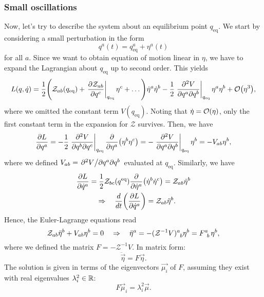 \documentclass{article}
\begin{document}
\subsubsection*{Small oscillations}
Now, let's try to describe the system about an equilibrium point $ q_{\text{eq}} $. We start by considering a small perturbation in the form
\begin{equation}
	q^{a}(t) = q^{a}_{\text{eq}} + \eta^{a}(t)
\end{equation}
for all $ a $. Since we want to obtain equation of motion linear in $ \eta $, we have to expand the Lagrangian about $ q_{\text{eq}} $ up to second order. This yields
\begin{equation}
	L(q,\dot{q}) = \frac{1}{2} \qty(\mathcal{Z}_{ab}(q_{\text{eq}}) + \eval{\pdv{\mathcal{Z}_{ab}}{q^{c}}}_{q_{\text{eq}}} \eta^{c} + \dots ) \dot{\eta}^{a} \dot{\eta}^{b} - \frac{1}{2} \eval{\pdv{V}{q^{a}}{q^{b}}}_{q_{\text{eq}}} \eta^{a} \eta^{b} + \order{\eta^{3}},
\end{equation}
where we omitted the constant term $ V(q_{\text{eq}}) $. Noting that $ \dot{\eta} = \order{\eta} $, only the first constant term in the expansion for $ \mathcal{Z} $ survives. Then, we have
\[
	\pdv{L}{q^{a}} = - \frac{1}{2}\eval{\pdv{V}{q^{b}}{q^{c}}}_{q_{\text{eq}}} \pdv{\eta^{a}}(\eta^{b} \eta^{c}) = - \eval{\pdv{V}{q^{a}}{q^{b}}}_{q_{\text{eq}}} \eta^{b} = - V_{ab} \eta^{b},
\]
where we defined $ V_{ab} = \pdv*{V}{q^{a}}{q^{b}} $ evaluated at $ q_{\text{eq}} $. Similarly, we have
\begin{gather}
	\pdv{L}{\dot{q}^{a}} = \frac{1}{2} \mathcal{Z}_{bc}(q^{\text{eq}}) \pdv{\dot{\eta}^{a}} (\dot{\eta}^{b} \dot{\eta}^{c}) = \mathcal{Z}_{ab} \dot{\eta}^{b} \\
	\quad \Rightarrow \quad \dv{t}(\pdv{L}{\dot{q}^{a}}) = \mathcal{Z}_{ab} \ddot{\eta}^{b}.
\end{gather}
Hence, the Euler-Lagrange equations read
\begin{equation}
	\mathcal{Z}_{ab} \ddot{\eta}^{b} + V_{ab} \eta^{b} = 0 \implies \ddot{\eta}^{a} = - (\mathcal{Z}^{-1} V)\indices{^{a}_{b}} \eta^{b} = F\indices{^{a}_{b}} \eta^{b},
\end{equation}
where we defined the matrix $ F = -\mathcal{Z}^{-1} V $. In matrix form:
\begin{equation}
	\ddot{\vec{\eta}} = F \vec{\eta}.
\end{equation}
The solution is given in terms of the eigenvectors $ \vec{\mu_i} $ of $ F $, assuming they exist with real eigenvalues $ \lambda_{i}^{2} \in \mathbb{R} $:
\begin{equation}
	F \vec{\mu}_{i} = \lambda_{i}^{2} \vec{\mu}.
\end{equation}
\end{document}
